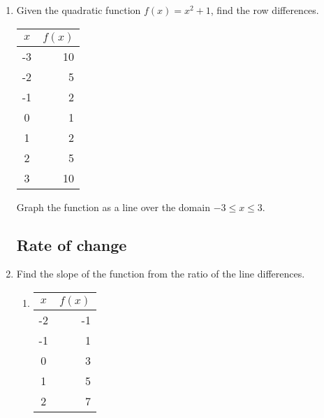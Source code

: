 \documentclass[12pt, oneside]{article}
\begin{document}
\begin{enumerate}
\item Given the quadratic function $f(x)=x^2+1$, find the row differences.
  \renewcommand{\arraystretch}{1.6}
    \begin{center}
      \begin{tabular}{|c|r|}
      \hline
      $x$ & $f(x)$\\
      \hline
      -3 & 10 \\
      \hline
      -2 & 5 \\
      \hline
      -1 & 2 \\
      \hline
      0 & 1 \\
      \hline
      1 & 2 \\
      \hline
      2 & 5 \\
      \hline
      3 & 10 \\
      \hline
      \end{tabular}
    \end{center}
Graph the function as a line over the domain $-3 \leq x \leq 3$.

\begin{center} %
\end{center}

\newpage
\subsection*{Rate of change}

\item Find the slope of the function from the ratio of the line differences.

  \begin{multicols}{2}
  \begin{enumerate}
    \item
      \begin{tabular}{|c|r|}
      \hline
      $x$ & $f(x)$\\
      \hline
      -2 & -1 \\
      \hline
      -1 & 1 \\
      \hline
      0 & 3 \\
      \hline
      1 & 5 \\
      \hline
      2 & 7 \\
      \hline
      \end{tabular}\\[0.85cm]


\end{enumerate}
\end{multicols}
\end{enumerate}
\end{document}
